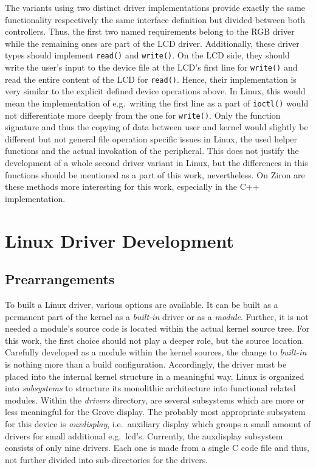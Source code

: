The variants using two distinct driver implementations provide exactly the same functionality respectively the same interface definition but divided between both controllers.
Thus, the first two named requirements belong to the RGB driver while the remaining ones are part of the LCD driver.
Additionally, these driver types should implement \texttt{read()} and \texttt{write()}.
On the LCD side, they should write the user's input to the device file at the LCD's first line for \texttt{write()} and read the entire content of the LCD for \texttt{read()}.
Hence, their implementation is very similar to the explicit defined device operations above.
In Linux, this would mean the implementation of e.g.\ writing the first line as a part of \texttt{ioctl()} would not differentiate more deeply from the one for \texttt{write()}.
Only the function signature and thus the copying of data between user and kernel would slightly be different but not general file operation specific issues in Linux, the used helper functions and the actual invokation of the peripheral.
This does not justify the development of a whole second driver variant in Linux, but the differences in this functions should be mentioned as a part of this work, nevertheless.
On Ziron are these methods more interesting for this work, especially in the C++ implementation.


\section{Linux Driver Development}\label{sec:cs-linux}

\subsection{Prearrangements}
To built a Linux driver, various options are available.
It can be built as a permanent part of the kernel as a \textit{built-in} driver or as a \textit{module}.
Further, it is not needed a module's source code is located within the actual kernel source tree.
For this work, the first choice should not play a deeper role, but the source location.
Carefully developed as a module within the kernel sources, the change to \textit{built-in} is nothing more than a build configuration.
Accordingly, the driver must be placed into the internal kernel structure in a meaningful way.
Linux is organized into \textit{subsystems} to structure its monolithic architecture into functional related modules.
Within the \textit{drivers} directory, are several subsystems which are more or less meaningful for the Grove display.
The probably most appropriate subsystem for this device is \textit{auxdisplay}, i.e.\ auxiliary display which groups a small amount of drivers for small additional e.g.\ \ac{lcd}'s.
Currently, the auxdisplay subsystem consists of only nine drivers.
Each one is made from a single C code file and thus, not further divided into sub-directories for the drivers.


